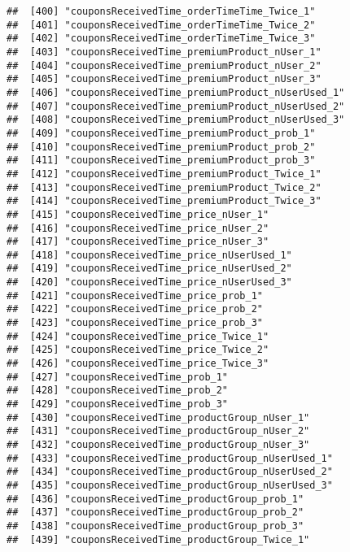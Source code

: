 \documentclass[10pt]{report}
\begin{document}
\begin{verbatim}
##  [400] "couponsReceivedTime_orderTimeTime_Twice_1"            
##  [401] "couponsReceivedTime_orderTimeTime_Twice_2"            
##  [402] "couponsReceivedTime_orderTimeTime_Twice_3"            
##  [403] "couponsReceivedTime_premiumProduct_nUser_1"           
##  [404] "couponsReceivedTime_premiumProduct_nUser_2"           
##  [405] "couponsReceivedTime_premiumProduct_nUser_3"           
##  [406] "couponsReceivedTime_premiumProduct_nUserUsed_1"       
##  [407] "couponsReceivedTime_premiumProduct_nUserUsed_2"       
##  [408] "couponsReceivedTime_premiumProduct_nUserUsed_3"       
##  [409] "couponsReceivedTime_premiumProduct_prob_1"            
##  [410] "couponsReceivedTime_premiumProduct_prob_2"            
##  [411] "couponsReceivedTime_premiumProduct_prob_3"            
##  [412] "couponsReceivedTime_premiumProduct_Twice_1"           
##  [413] "couponsReceivedTime_premiumProduct_Twice_2"           
##  [414] "couponsReceivedTime_premiumProduct_Twice_3"           
##  [415] "couponsReceivedTime_price_nUser_1"                    
##  [416] "couponsReceivedTime_price_nUser_2"                    
##  [417] "couponsReceivedTime_price_nUser_3"                    
##  [418] "couponsReceivedTime_price_nUserUsed_1"                
##  [419] "couponsReceivedTime_price_nUserUsed_2"                
##  [420] "couponsReceivedTime_price_nUserUsed_3"                
##  [421] "couponsReceivedTime_price_prob_1"                     
##  [422] "couponsReceivedTime_price_prob_2"                     
##  [423] "couponsReceivedTime_price_prob_3"                     
##  [424] "couponsReceivedTime_price_Twice_1"                    
##  [425] "couponsReceivedTime_price_Twice_2"                    
##  [426] "couponsReceivedTime_price_Twice_3"                    
##  [427] "couponsReceivedTime_prob_1"                           
##  [428] "couponsReceivedTime_prob_2"                           
##  [429] "couponsReceivedTime_prob_3"                           
##  [430] "couponsReceivedTime_productGroup_nUser_1"             
##  [431] "couponsReceivedTime_productGroup_nUser_2"             
##  [432] "couponsReceivedTime_productGroup_nUser_3"             
##  [433] "couponsReceivedTime_productGroup_nUserUsed_1"         
##  [434] "couponsReceivedTime_productGroup_nUserUsed_2"         
##  [435] "couponsReceivedTime_productGroup_nUserUsed_3"         
##  [436] "couponsReceivedTime_productGroup_prob_1"              
##  [437] "couponsReceivedTime_productGroup_prob_2"              
##  [438] "couponsReceivedTime_productGroup_prob_3"              
##  [439] "couponsReceivedTime_productGroup_Twice_1"             

\end{verbatim}
\end{document}
